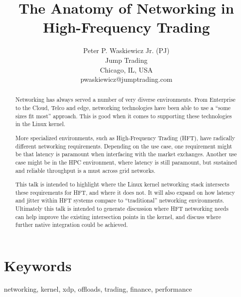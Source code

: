 \documentclass[letterpaper]{article}
\title{The Anatomy of Networking in High-Frequency Trading}
\author{Peter P. Waskiewicz Jr. (PJ) \\ Jump Trading \\ Chicago, IL, USA \\ pwaskiewicz@jumptrading.com
\newline
\newline
}
\begin{document}
 
\maketitle
\begin{abstract}
Networking has always served a number of very diverse environments. From Enterprise to the Cloud, Telco and edge, networking technologies have been able to use a “some sizes fit most” approach. This is good when it comes to supporting these technologies in the Linux kernel.

More specialized environments, such as High-Frequency Trading (HFT), have radically different networking requirements. Depending on the use case, one requirement might be that latency is paramount when interfacing with the market exchanges. Another use case might be in the HPC environment, where latency is still paramount, but sustained and reliable throughput is a must across grid networks.

This talk is intended to highlight where the Linux kernel networking stack intersects these requirements for HFT, and where it does not. It will also expand on how latency and jitter within HFT systems compare to “traditional” networking environments. Ultimately this talk is intended to generate discussion where HFT networking needs can help improve the existing intersection points in the kernel, and discuss where further native integration could be achieved.
\end{abstract}

\section{Keywords}

networking, kernel, xdp, offloads, trading, finance, performance
\end{document}
